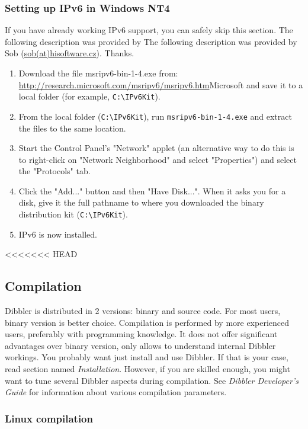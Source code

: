 \subsubsection{Setting up IPv6 in Windows NT4}
If you have already working IPv6 support, you can safely skip this
section.  The following description was provided by The following
description was provided by Sob
(\href{mailto:sob(at)hisoftware.cz}{sob(at)hisoftware.cz}). Thanks.

\begin{enumerate}
  \item Download the file msripv6-bin-1-4.exe from:
    \url{http://research.microsoft.com/msripv6/msripv6.htm}{Microsoft}
    and save it to a local folder (for example, \verb+C:\IPv6Kit+).
  \item From the local folder (\verb+C:\IPv6Kit+), run
    \verb+msripv6-bin-1-4.exe+ and extract the files to the same
    location.
  \item Start the Control Panel's "Network" applet (an alternative way to do this is
    to right-click on "Network Neighborhood" and select "Properties") and select
    the "Protocols" tab.
  \item Click the "Add..." button and then "Have Disk...". When it asks you for
    a disk, give it the full pathname to where you downloaded the binary
    distribution kit (\verb+C:\IPv6Kit+).
  \item IPv6 is now installed.
\end{enumerate}
<<<<<<< HEAD

\subsection{Compilation}
Dibbler is distributed in 2 versions: binary and source code. For
most users, binary version is better choice.  Compilation is
performed by more experienced users, preferably with programming
knowledge. It does not offer significant advantages over binary version,
only allows to understand internal Dibbler workings. You probably want
just install and use Dibbler. If that is your case, read section
named \emph{Installation}. However, if you are skilled enough, you might
want to tune several Dibbler aspects during compilation. See \emph{
Dibbler Developer's Guide} for information about various compilation parameters.

\subsubsection{Linux compilation}


